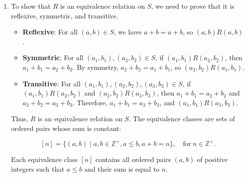 \begin{enumerate}
Thus, $R$ is an equivalence relation on $\mathbb{Q}$. The equivalence classes are:

$$
[q] = \{q + n \mid n \in \mathbb{Z}\}, \quad \text{for}\ q \in \mathbb{Q}.
$$



Each equivalence class $[q]$ contains all rational numbers that differ by an integer from $q$. These equivalence classes partition the set of rational numbers.

\item
To show that $R$ is an equivalence relation on $S$, we need to prove that it is reflexive, symmetric, and transitive.

\begin{itemize}
\item \textbf{Reflexive}: For all $(a, b) \in S$, we have $a + b = a + b$, so $(a, b)R(a, b)$.
\item \textbf{Symmetric}: For all $(a_1, b_1), (a_2, b_2) \in S$, if $(a_1, b_1)R(a_2, b_2)$, then $a_1 + b_1 = a_2 + b_2$. By symmetry, $a_2 + b_2 = a_1 + b_1$, so $(a_2, b_2)R(a_1, b_1)$.
\item \textbf{Transitive}: For all $(a_1, b_1), (a_2, b_2), (a_3, b_3) \in S$, if $(a_1, b_1)R(a_2, b_2)$ and $(a_2, b_2)R(a_3, b_3)$, then $a_1 + b_1 = a_2 + b_2$ and $a_2 + b_2 = a_3 + b_3$. Therefore, $a_1 + b_1 = a_3 + b_3$, and $(a_1, b_1)R(a_3, b_3)$.
\end{itemize}

Thus, $R$ is an equivalence relation on $S$. The equivalence classes are sets of ordered pairs whose sum is constant:

$$
[n] = \{(a, b) \mid a, b \in \mathbb{Z}^+, a \leq b, a + b = n\}, \quad \text{for}\ n \in \mathbb{Z}^+.
$$

Each equivalence class $[n]$ contains all ordered pairs $(a, b)$ of positive integers such that $a \leq b$ and their sum is equal to $n$.
\end{enumerate}
